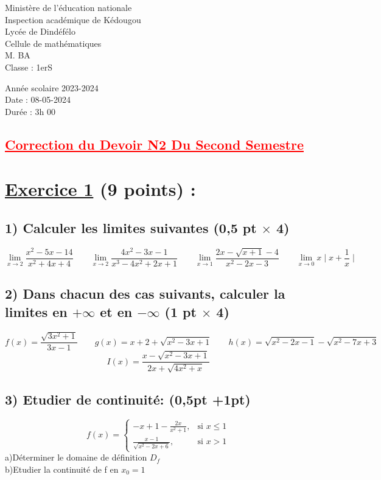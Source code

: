 \documentclass{article}
\begin{document}
\begin{minipage}{0.7\textwidth}
	Ministère de l'éducation nationale  \\
	Inspection académique de Kédougou   \\
	Lycée de Dindéfélo            \\
	Cellule de mathématiques            \\
	M. BA                          \\
	Classe : 1erS  \\
\end{minipage}
\begin{minipage}{0.5\textwidth}
	Année scolaire 2023-2024 \\
	Date : 08-05-2024 \\
	Durée : 3h 00 \\
\end{minipage}

\begin{center}
	\section*{\textcolor{red}{\underline{Correction du Devoir N2 Du Second Semestre}}}
\end{center}

\section*{\underline{Exercice 1} (9 points) :}
\subsection*{1) Calculer les limites suivantes (0,5 pt $\times$ 4)}
\[ \lim_{x \to 2}\frac{x^{2}-5x-14}{x^{2}+4x+4}\quad\quad 
\lim_{x \to 2}\frac{4x^{2}-3x-1}{x^{3}-4x^{2}+2x+1}\quad\quad 
\lim_{x \to 1}\frac{2x-\sqrt{x+1}-4}{x^{2}-2x-3}\quad\quad 
\lim_{x \to 0}x\mid x+\frac{1}{x}\mid\]
\subsection*{2) Dans chacun des cas suivants, calculer la limites en $+\infty$ et en $-\infty$ (1 pt $\times$ 4)}
\[ f(x)=\frac{\sqrt{3x^{2}+1}}{3x-1}\quad\quad 
g(x)=x+2+\sqrt{x^{2}-3x+1}\quad\quad 
h(x)=\sqrt{x^{2}-2x-1}-\sqrt{x^{2}-7x+3} \]
\[I(x)=\frac{x-\sqrt{x^{2}-3x+1}}{2x+\sqrt{4x^{2}+x}} \]
\subsection*{3) Etudier de continuité: (0,5pt +1pt)}
\[ f(x) = \begin{cases} 
  -x+1-\frac{2x}{x^{2}+1}, & \text{si } x \leq 1 \\
  \frac{x-1}{\sqrt{x^{2}-2x+6}}, & \text{si } x > 1
\end{cases} \]
a)Déterminer le domaine de définition $D_{f}$\\
b)Etudier la continuité de f en $x_{0}=1$
\end{document}

